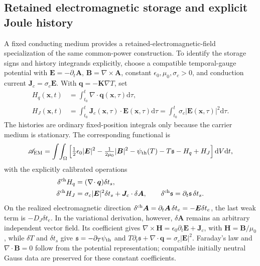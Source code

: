 \documentclass[11pt,a4paper]{article}
\theoremstyle{remark}\newtheorem{remark}{Remark}
\numberwithin{equation}{section}
\newcommand{\dd}{\mathrm{d}}
\newcommand{\BB}{\boldsymbol B}
\newcommand{\JJ}{\boldsymbol J}
\newcommand{\Avec}{\boldsymbol A}
\newcommand{\EE}{\boldsymbol E}
\newcommand{\xx}{\boldsymbol x}
\newcommand{\qv}{\boldsymbol q}
\newcommand{\grad}{\nabla}
\newcommand{\diver}{\nabla\!\cdot}
\newcommand{\curl}{\nabla\!\times}
\newcommand{\st}{\mathfrak s}
\begin{document}
\subsection{Retained electromagnetic storage and explicit Joule history}
A fixed conducting medium provides a retained-electromagnetic-field specialization of the same common-power construction. To identify the storage signs and history integrands explicitly, choose a compatible temporal-gauge potential with $\EE=-\partial_t\Avec$, $\BB=\curl\Avec$, constant $\epsilon_0,\mu_0,\sigma_c>0$, and conduction current $\JJ_c=\sigma_c\EE$. With $\qv=-\boldsymbol K\grad T$, set
\begin{equation}
\begin{aligned}
H_q(\xx,t)&=\int_{t_0}^{t}\diver\qv(\xx,\tau)\dd\tau,\\
H_J(\xx,t)&=\int_{t_0}^{t}\JJ_c(\xx,\tau)\cdot\EE(\xx,\tau)\dd\tau
=\int_{t_0}^{t}\sigma_c|\EE(\xx,\tau)|^2\dd\tau.
\end{aligned}
\label{eq:reviewEMhistories}
\end{equation}
The histories are ordinary fixed-position integrals only because the carrier medium is stationary. The corresponding functional is
\begin{equation}
\mathscr A_{\rm EM}=\int\!\int_\Omega
\left[\tfrac12\epsilon_0|\EE|^2-\tfrac1{2\mu_0}|\BB|^2
-\psi_{\rm th}(T)-T\st-H_q+H_J\right]\dd V\dd t,
\label{eq:reviewmaxwellaction}
\end{equation}
with the explicitly calibrated operations
\begin{equation}
\begin{aligned}
\delta^{\rm ch}H_q&=(\diver\qv)\delta t_s,\\
\delta^{\rm ch}H_J&=\sigma_c|\EE|^2\delta t_s+\JJ_c\cdot\delta\Avec,
\qquad \delta^{\rm ch}\st=\partial_t\st\,\delta t_s.
\end{aligned}
\label{eq:reviewEMrules}
\end{equation}
On the realized electromagnetic direction $\delta^{\rm ch}\Avec=\partial_t\Avec\,\delta t_e=-\EE\delta t_e$, the last weak term is $-D_J\delta t_e$. In the variational derivation, however, $\delta\Avec$ remains an arbitrary independent vector field. Its coefficient gives $\curl\boldsymbol H=\epsilon_0\partial_t\EE+\JJ_c$, with $\boldsymbol H=\BB/\mu_0$, while $\delta T$ and $\delta t_s$ give $\st=-\partial_T\psi_{\rm th}$ and $T\partial_t\st+\diver\qv=\sigma_c|\EE|^2$. Faraday's law and $\diver\BB=0$ follow from the potential representation; compatible initially neutral Gauss data are preserved for these constant coefficients.
\end{document}
